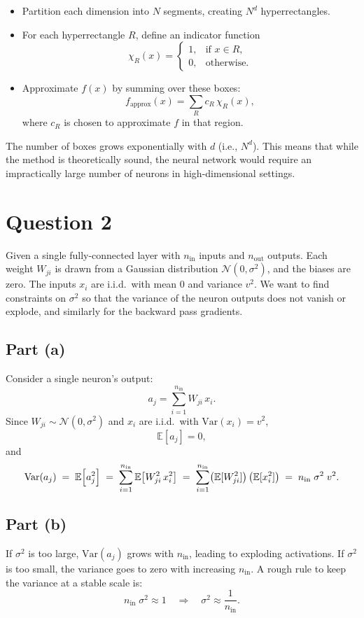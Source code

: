 \documentclass{article}
\begin{document}
\begin{itemize}
    \item Partition each dimension into \(N\) segments, creating \(N^d\) hyperrectangles.
    \item For each hyperrectangle \( R \), define an indicator function
    \[
    \chi_R(x) =
    \begin{cases}
    1, & \text{if } x \in R,\\[1mm]
    0, & \text{otherwise.}
    \end{cases}
    \]
    \item Approximate \( f(x) \) by summing over these boxes:
    \[
    f_{\text{approx}}(x) = \sum_R c_R\, \chi_R(x),
    \]
    where \( c_R \) is chosen to approximate \( f \) in that region.
\end{itemize}
The number of boxes grows exponentially with \( d \) (i.e., \(N^d\)). This means that while the method is theoretically sound, the neural network would require an impractically large number of neurons in high-dimensional settings.

\newpage
\section*{Question 2}

Given a  single fully-connected layer with $n_{\text{in}}$ inputs and $n_{\text{out}}$ outputs. Each weight $W_{ji}$ is drawn from a Gaussian distribution $\mathcal{N}(0, \sigma^2)$, and the biases are zero. The inputs $x_i$ are i.i.d.\ with mean 0 and variance $v^2$. We want to find constraints on $\sigma^2$ so that the variance of the neuron outputs does not vanish or explode, and similarly for the backward pass gradients.
\subsection*{Part (a)}
Consider a single neuron's output:
\[
a_j = \sum_{i=1}^{n_{\text{in}}} W_{ji}\, x_i.
\]
Since $W_{ji} \sim \mathcal{N}(0, \sigma^2)$ and $x_i$ are i.i.d.\ with $\mathrm{Var}(x_i) = v^2$,
\[
\mathbb{E}[a_j] = 0, 
\]
and
\[
\mathrm{Var}(a_j) \;=\; \mathbb{E}\Bigl[a_j^2\Bigr] 
\;=\; \sum_{i=1}^{n_{\text{in}}} \mathbb{E}\bigl[W_{ji}^2\, x_i^2\bigr]
\;=\; \sum_{i=1}^{n_{\text{in}}} \bigl(\mathbb{E}[W_{ji}^2]\bigr)\,\bigl(\mathbb{E}[x_i^2]\bigr)
\;=\; n_{\text{in}}\;\sigma^2\;v^2.
\]

\subsection*{Part (b)}
If $\sigma^2$ is too large, $\mathrm{Var}(a_j)$ grows with $n_{\text{in}}$, leading to exploding activations. If $\sigma^2$ is too small, the variance goes to zero with increasing $n_{\text{in}}$. A rough rule to keep the variance at a stable scale is:
\[
n_{\text{in}}\;\sigma^2 \approx 1 
\quad\Longrightarrow\quad 
\sigma^2 \approx \frac{1}{n_{\text{in}}}.
\]
\end{document}
